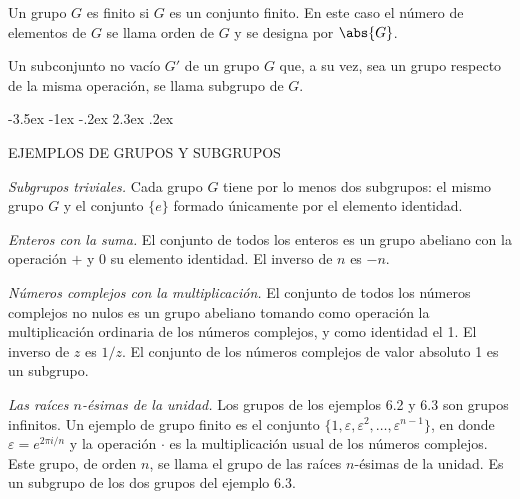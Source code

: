 \documentclass[12pt,a4paper]{book}
\makeatletter
\renewcommand\section{\@startsection{section}{1}{\z@}%
  {-3.5ex \@plus -1ex \@minus -.2ex}%
  {2.3ex \@plus .2ex}%
  {\normalfont\Large\bfseries\raggedright}}
\makeatother
\begin{document}
    \begin{definicion}
        Un grupo $G$ es finito si $G$ es un conjunto finito. En este caso el número de
        elementos de $G$ se llama orden de $G$ y se designa por $\abs{G}$.
    \end{definicion}

    \begin{definicion}[Subgrupo]
        Un subconjunto no vacío $G'$ de un grupo $G$ que, a su vez, sea un grupo respecto
        de la misma operación, se llama subgrupo de $G$.
    \end{definicion}

    \section{EJEMPLOS DE GRUPOS Y SUBGRUPOS}

    \begin{ejemplo}
        \textit{Subgrupos triviales.} Cada grupo $G$ tiene por lo menos dos subgrupos: el
        mismo grupo $G$ y el conjunto $\{e\}$ formado únicamente por el elemento
        identidad.
    \end{ejemplo}

    \begin{ejemplo}
        \textit{Enteros con la suma.} El conjunto de todos los enteros es un grupo
        abeliano con la operación $+$ y $0$ su elemento identidad. El inverso de $n$ es
        $-n$.
    \end{ejemplo}

    \begin{ejemplo}
        \textit{Números complejos con la multiplicación.} El conjunto de todos los números
        complejos no nulos es un grupo abeliano tomando como operación la multiplicación
        ordinaria de los números complejos, y como identidad el 1. El inverso de $z$ es
        $1/z$. El conjunto de los números complejos de valor absoluto 1 es un subgrupo.
    \end{ejemplo}

    \begin{ejemplo}
        \textit{Las raíces $n$-ésimas de la unidad.} Los grupos de los ejemplos 6.2 y 6.3 son
        grupos infinitos. Un ejemplo de grupo finito es el conjunto
        $\{1,\varepsilon,\varepsilon^{2},\dots,\varepsilon^{n-1}\}$, en donde
        $\varepsilon=e^{2\pi i/n}$ y la operación $\cdot$ es la multiplicación usual de los
        números complejos. Este grupo, de orden $n$, se llama el grupo de las raíces
        $n$-ésimas de la unidad. Es un subgrupo de los dos grupos del ejemplo 6.3.
    \end{ejemplo}
\end{document}
